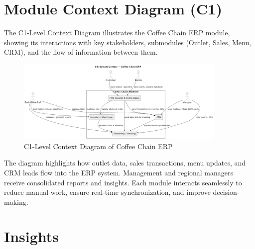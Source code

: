 \section*{Module Context Diagram (C1)}

The C1-Level Context Diagram illustrates the Coffee Chain ERP module, showing its interactions with key stakeholders, submodules (Outlet, Sales, Menu, CRM), and the flow of information between them.

\begin{figure}[H]
\centering
\includegraphics[width=0.9\textwidth,keepaspectratio]{diagrams/context.png}
\caption{C1-Level Context Diagram of Coffee Chain ERP}
\end{figure}

The diagram highlights how outlet data, sales transactions, menu updates, and CRM leads flow into the ERP system. Management and regional managers receive consolidated reports and insights. Each module interacts seamlessly to reduce manual work, ensure real-time synchronization, and improve decision-making.

\vspace{1em}

\section*{Insights}

